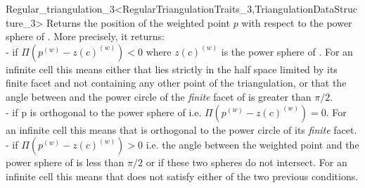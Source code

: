 \begin{ccRefClass}{Regular_triangulation_3<RegularTriangulationTraits_3,TriangulationDataStructure_3>}
{Returns the position of the weighted point $p$ with respect to the
power sphere of . More precisely, it returns:\\
-  if $\Pi({p}^{(w)}-{z(c)}^{(w)})<0$ where
${z(c)}^{(w)}$ is the power sphere of . For an
infinite cell this means either that  lies strictly in the half
space limited by its finite facet and not containing any other point
of the triangulation, or that the angle 
between  and the power circle of the \textit{finite} facet of 
is greater than $\pi/2$. \\  
-  if p is orthogonal to the power sphere of 
i.e. $\Pi({p}^{(w)}-{z(c)}^{(w)})=0$. For an infinite cell this means
that  is orthogonal to the power circle of its \textit{finite} facet.\\ 
-  if $\Pi({p}^{(w)}-{z(c)}^{(w)})>0$
i.e. the angle between the weighted point  and the power sphere
of  is less than $\pi/2$ or if these two spheres do not
intersect. For an 
infinite cell this means that  does not satisfy either of the
two previous conditions. 
}


\end{ccRefClass}
